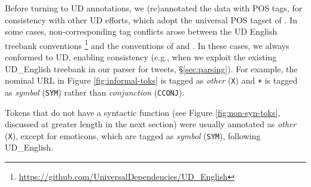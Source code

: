\documentclass[11pt,a4paper]{article}
\newcommand{\heart}{\ensuremath\heartsuit}
\newcommand{\yjcomment}[1]{\textcolor{orange}{[$_\mathrm{L}^\mathrm{Y}$#1]}}
\newcommand{\yicomment}[1]{\textcolor{gray}{[#1 ---\textsc{Yi}]}}
\begin{document}
Before turning to UD annotations, we (re)annotated the data with 
POS tags, for consistency with other UD efforts,
which adopt the universal POS tagset of .
In some cases,  non-corresponding tag conflicts arose between the UD English 
treebank conventions \cite[UD\_English;][]{Marneffe2014UniversalSD}\footnote{\url{https://github.com/UniversalDependencies/UD_English}}
and the conventions of  and
.  %
In these cases, we always
conformed to UD, enabling consistency (e.g., when we exploit the
existing UD\_English treebank in our parser for tweets, \S\ref{sec:parsing}).  For example,  
the nominal URL in Figure \ref{fig:informal-toks} is tagged as {\it
  other} ({\tt X}) and {\tt +} is tagged as {\it symbol} ({\tt SYM})
rather than {\it conjunction} ({\tt CCONJ}).  

Tokens that do not have a syntactic function (see Figure \ref{fig:non-syn-toks}, discussed at greater
length in the next section) were usually annotated as \emph{other}
(\texttt{X}), except for emoticons, which are tagged as \emph{symbol}
(\texttt{SYM}), following UD\_English.
\end{document}
